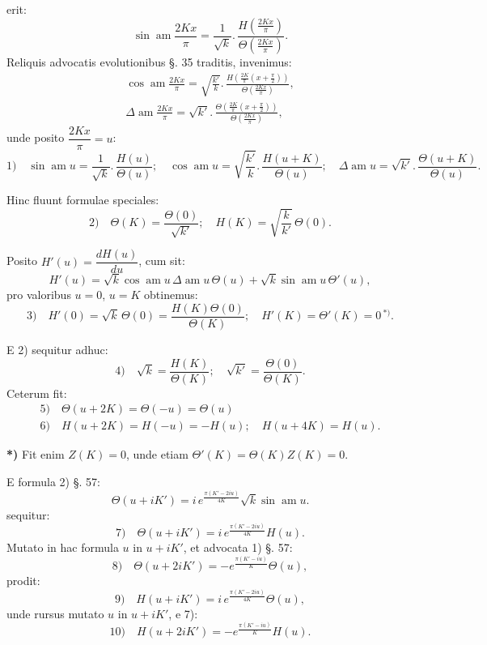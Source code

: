 \documentclass{article}
\begin{document}
erit:
\[
\sin\operatorname{am}\frac{2Kx}{\pi}=\frac{1}{\sqrt{k}}.\,\frac{H\left(\frac{2Kx}{\pi}\right)}{\Theta\left(\frac{2Kx}{\pi}\right)}.
\]
Reliquis advocatis evolutionibus §. 35 traditis, invenimus:
\[
\begin{gathered}
\cos\operatorname{am}\frac{2Kx}{\pi}=\sqrt{\frac{k'}{k}}.\,\frac{H\left(\frac{2K}{\pi}\left(x+\frac{\pi}{2}\right)\right)}{\Theta\left(\frac{2Kx}{\pi}\right)},\\[2ex]
\Delta\operatorname{am}\frac{2Kx}{\pi}=\sqrt{k'}.\,\frac{\Theta\left(\frac{2K}{\pi}\left(x+\frac{\pi}{2}\right)\right)}{\Theta\left(\frac{2Kx}{\pi}\right)},
\end{gathered}
\]
unde posito $\dfrac{2Kx}{\pi}=u$:
\[
\text{1)}\quad\sin\operatorname{am}u=\frac{1}{\sqrt{k}}.\,\frac{H(u)}{\Theta(u)};\quad\cos\operatorname{am}u=\sqrt{\frac{k'}{k}}.\,\frac{H(u+K)}{\Theta(u)};\quad\Delta\operatorname{am}u=\sqrt{k'}.\,\frac{\Theta(u+K)}{\Theta(u)}.
\]

Hinc fluunt formulae speciales:
\[
\text{2)}\quad\Theta(K)=\frac{\Theta(0)}{\sqrt{k'}};\quad H(K)=\sqrt{\frac{k}{k'}}\,\Theta(0).
\]

Posito $H'(u)=\dfrac{dH(u)}{du}$, cum sit:
\[
H'(u)=\sqrt{k}\cos\operatorname{am}u\,\Delta\operatorname{am}u\,\Theta(u)+\sqrt{k}\sin\operatorname{am}u\,\Theta'(u),
\]
pro valoribus $u=0$, $u=K$ obtinemus:
\[
\text{3)}\quad H'(0)=\sqrt{k}\,\Theta(0)=\frac{H(K)\Theta(0)}{\Theta(K)};\quad H'(K)=\Theta'(K)=0\,{}^{*)}.
\]

E 2) sequitur adhuc:
\[
\text{4)}\quad\sqrt{k}=\frac{H(K)}{\Theta(K)};\quad\sqrt{k'}=\frac{\Theta(0)}{\Theta(K)}.
\]
Ceterum fit:
\[
\begin{gathered}
\text{5)}\quad\Theta(u+2K)=\Theta(-u)=\Theta(u)\\[1ex]
\text{6)}\quad H(u+2K)=H(-u)=-H(u);\quad H(u+4K)=H(u).
\end{gathered}
\]

\textbf{*)} Fit enim $Z(K)=0$, unde etiam $\Theta'(K)=\Theta(K)Z(K)=0$.

E formula 2) §. 57:
\[
\Theta(u+iK')=i\,e^{\frac{\pi(K'-2iu)}{4K}}\sqrt{k}\sin\operatorname{am}u.
\]
sequitur:
\[
\text{7)}\quad\Theta(u+iK')=i\,e^{\frac{\pi(K'-2iu)}{4K}}H(u).
\]
Mutato in hac formula $u$ in $u+iK'$, et advocata 1) §. 57:
\[
\text{8)}\quad\Theta(u+2iK')=-e^{\frac{\pi(K'-iu)}{K}}\Theta(u),
\]
prodit:
\[
\text{9)}\quad H(u+iK')=i\,e^{\frac{\pi(K'-2iu)}{4K}}\Theta(u),
\]
unde rursus mutato $u$ in $u+iK'$, e 7):
\[
\text{10)}\quad H(u+2iK')=-e^{\frac{\pi(K'-iu)}{K}}H(u).
\]
\end{document}
